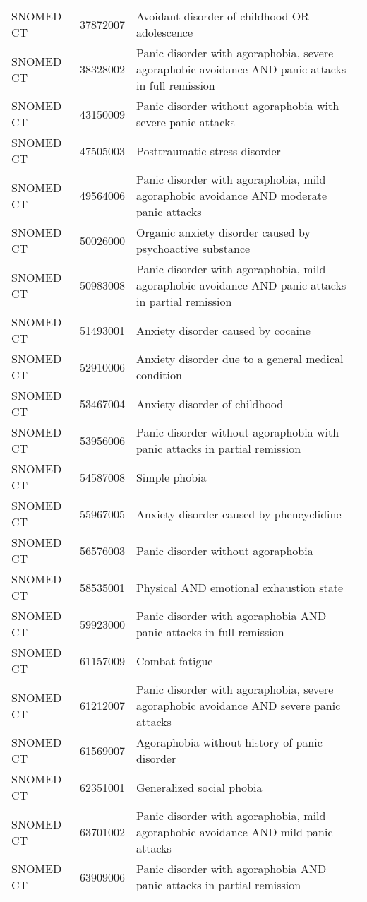 \begin{longtable}{p{}p{}p{}}
  SNOMED CT & 37872007 & Avoidant disorder of childhood OR adolescence \\ 
  SNOMED CT & 38328002 & Panic disorder with agoraphobia, severe agoraphobic avoidance AND panic attacks in full remission \\ 
  SNOMED CT & 43150009 & Panic disorder without agoraphobia with severe panic attacks \\ 
  SNOMED CT & 47505003 & Posttraumatic stress disorder \\ 
  SNOMED CT & 49564006 & Panic disorder with agoraphobia, mild agoraphobic avoidance AND moderate panic attacks \\ 
  SNOMED CT & 50026000 & Organic anxiety disorder caused by psychoactive substance \\ 
  SNOMED CT & 50983008 & Panic disorder with agoraphobia, mild agoraphobic avoidance AND panic attacks in partial remission \\ 
  SNOMED CT & 51493001 & Anxiety disorder caused by cocaine \\ 
  SNOMED CT & 52910006 & Anxiety disorder due to a general medical condition \\ 
  SNOMED CT & 53467004 & Anxiety disorder of childhood \\ 
  SNOMED CT & 53956006 & Panic disorder without agoraphobia with panic attacks in partial remission \\ 
  SNOMED CT & 54587008 & Simple phobia \\ 
  SNOMED CT & 55967005 & Anxiety disorder caused by phencyclidine \\ 
  SNOMED CT & 56576003 & Panic disorder without agoraphobia \\ 
  SNOMED CT & 58535001 & Physical AND emotional exhaustion state \\ 
  SNOMED CT & 59923000 & Panic disorder with agoraphobia AND panic attacks in full remission \\ 
  SNOMED CT & 61157009 & Combat fatigue \\ 
  SNOMED CT & 61212007 & Panic disorder with agoraphobia, severe agoraphobic avoidance AND severe panic attacks \\ 
  SNOMED CT & 61569007 & Agoraphobia without history of panic disorder \\ 
  SNOMED CT & 62351001 & Generalized social phobia \\ 
  SNOMED CT & 63701002 & Panic disorder with agoraphobia, mild agoraphobic avoidance AND mild panic attacks \\ 
  SNOMED CT & 63909006 & Panic disorder with agoraphobia AND panic attacks in partial remission \\ 

\end{longtable}
